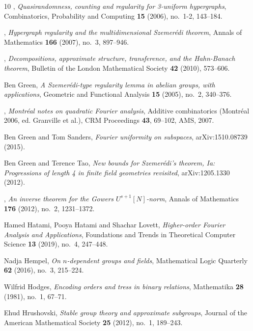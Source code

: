 \documentclass[12pt,oneside,british,a4wide]{amsart}
\numberwithin{equation}{section}
\theoremstyle{definition}
\begin{document}
\begin{thebibliography}{10}
\bysame, \emph{{Quasirandomness, counting and regularity for 3-uniform
  hypergraphs}}, Combinatorics, Probability and Computing \textbf{15} (2006),
  no.~1-2, 143--184.

\bysame, \emph{{Hypergraph regularity and the multidimensional Szemer\'edi
  theorem}}, Annals of Mathematics \textbf{166} (2007), no.~3,
  897--946.

\bysame, \emph{Decompositions, approximate structure, transference, and the Hahn-Banach theorem}, Bulletin of the London Mathematical Society \textbf{42} (2010), 573--606.


Ben Green, \emph{{A Szemer\'edi-type regularity lemma in abelian groups, with
  applications}}, Geometric and Functional Analysis \textbf{15} (2005), no.~2,
  340--376.

\bysame, \emph{{Montr\'eal notes on quadratic Fourier analysis}}, Additive
  combinatorics (Montr\'eal 2006, ed. Granville et al.), CRM Proceedings \textbf{43}, 69--102, AMS, 2007.

Ben Green and Tom Sanders, \emph{{Fourier uniformity on subspaces}},
  arXiv:1510.08739 (2015).


Ben Green and Terence Tao, \emph{New bounds for Szemer\'edi's theorem, Ia: Progressions of length 4 in finite field geometries revisited}, arXiv:1205.1330 (2012).


\bysame, \emph{{An inverse theorem for the Gowers
 $U^{s+1}[N]$-norm}}, Annals of Mathematics
  \textbf{176} (2012), no.~2, 1231--1372.


Hamed Hatami, Pooya Hatami and Shachar Lovett, \emph{Higher-order Fourier Analysis and Applications}, Foundations and Trends in Theoretical Computer Science \textbf{13} (2019), no.~4, 247--448.


Nadja Hempel, \emph{{On $n$-dependent groups and fields}}, Mathematical Logic
  Quarterly \textbf{62} (2016), no.~3, 215--224.

Wilfrid Hodges, \emph{{Encoding orders and tress in binary relations}},
  Mathematika \textbf{28} (1981), no.~1, 67--71.


Ehud Hrushovski, \emph{{Stable group theory and approximate subgroups}},
  Journal of the American Mathematical Society \textbf{25} (2012), no.~1,
  189--243.
  

\end{thebibliography}
\end{document}
